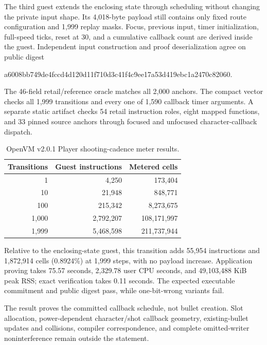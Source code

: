 The third guest extends the enclosing state through
 scheduling without changing the private input
shape.  Its 4,018-byte  payload still contains only fixed route
configuration and 1,999 replay masks.  Focus, previous input, timer
initialization, full-speed ticks, reset at 30, and a cumulative callback count
are derived inside the guest.  Independent input construction and proof
deserialization agree on public digest
\begin{center}
\small\ttfamily
a6008bb749de4fccd4d120d11f710d3c41f4c9ee17a53d419ebc1a2470c82060.
\end{center}

The 46-field retail/reference oracle matches all 2,000 anchors.  The compact
vector checks all 1,999 transitions and every one of 1,590 callback timer
arguments.  A separate static artifact checks 54 retail instruction roles,
eight mapped functions, and 33 pinned source anchors through focused and
unfocused character-callback dispatch.

\begin{table}[h]
  \centering
  \small
  \begin{tabular}{@{}rrr@{}}
    \toprule
    Transitions & Guest instructions & Metered cells \\
    \midrule
    1     & 4,250     & 173,404 \\
    10    & 21,948    & 848,771 \\
    100   & 215,342   & 8,273,675 \\
    1,000 & 2,792,207 & 108,171,997 \\
    1,999 & 5,468,598 & 211,737,944 \\
    \bottomrule
  \end{tabular}
  \caption{OpenVM v2.0.1 Player shooting-cadence meter results.}
  \label{tab:openvm-shooting-meter}
\end{table}

Relative to the enclosing-state guest, this transition adds 55,954
instructions and 1,872,914 cells (0.8924\%) at 1,999 steps, with no payload
increase.  Application proving takes 75.57 seconds, 2,329.78 user CPU seconds,
and 49,103,488 KiB peak RSS; exact verification takes 0.11 seconds.  The
expected executable commitment and public digest pass, while one-bit-wrong
variants fail.

The result proves the committed callback schedule, not bullet creation.  Slot
allocation, power-dependent character/shot callback geometry, existing-bullet
updates and collisions, compiler correspondence, and complete omitted-writer
noninterference remain outside the statement.

